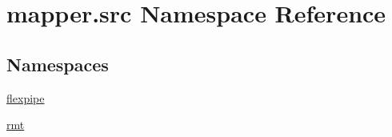 \hypertarget{namespacemapper_1_1src}{}\section{mapper.\+src Namespace Reference}
\label{namespacemapper_1_1src}
\subsection*{Namespaces}
\begin{DoxyCompactItemize}
\item 
 \hyperlink{namespacemapper_1_1src_1_1flexpipe}{flexpipe}
\item 
 \hyperlink{namespacemapper_1_1src_1_1rmt}{rmt}
\end{DoxyCompactItemize}
